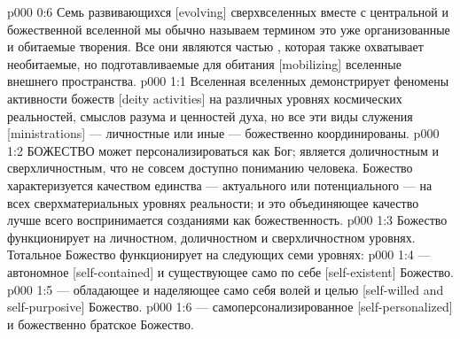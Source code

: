 \vs p000 0:6 Семь развивающихся [evolving] сверхвселенных вместе с центральной и божественной вселенной мы обычно называем термином  это уже организованные и обитаемые творения. Все они являются частью , которая также охватывает необитаемые, но подготавливаемые для обитания [mobilizing] вселенные внешнего пространства.
\vs p000 1:1 Вселенная вселенных демонстрирует феномены активности божеств [deity activities] на различных уровнях космических реальностей, смыслов разума и ценностей духа, но все эти виды служения [ministrations] --- личностные или иные --- божественно координированы.
\vs p000 1:2 \pc БОЖЕСТВО может персонализироваться как Бог; является доличностным и сверхличностным, что не совсем доступно пониманию человека. Божество характеризуется качеством единства --- актуального или потенциального --- на всех сверхматериальных уровнях реальности; и это объединяющее качество лучше всего воспринимается созданиями как божественность.
\vs p000 1:3 \pc Божество функционирует на личностном, доличностном и сверхличностном уровнях. Тотальное Божество функционирует на следующих семи уровнях:
\vs p000 1:4 \bibnobreakspace {} --- автономное [self\hyp{}contained] и существующее само по себе [self\hyp{}existent] Божество.
\vs p000 1:5 \bibnobreakspace {} --- обладающее и наделяющее само себя волей и целью [self\hyp{}willed and self\hyp{}purposive] Божество.
\vs p000 1:6 \bibnobreakspace {} --- самоперсонализированное [self\hyp{}personalized] и божественно братское Божество.
